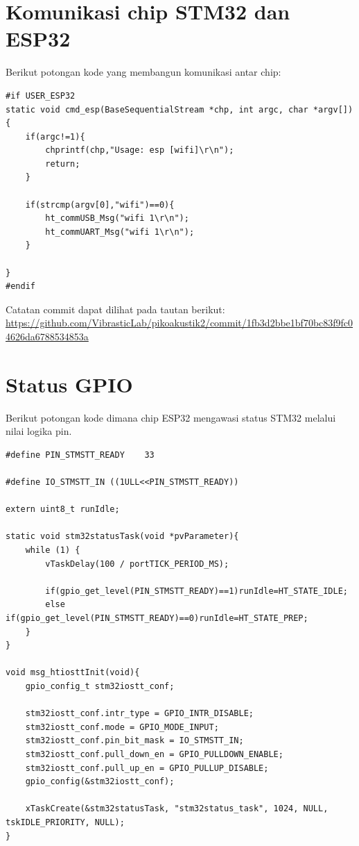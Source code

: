 \documentclass{book} %
\begin{document}
    \section{Komunikasi chip STM32 dan ESP32}
    
    Berikut potongan kode yang membangun komunikasi antar chip:
    
    \begin{verbatim}
#if USER_ESP32
static void cmd_esp(BaseSequentialStream *chp, int argc, char *argv[]) {
	if(argc!=1){
		chprintf(chp,"Usage: esp [wifi]\r\n");
		return;
	}
	
	if(strcmp(argv[0],"wifi")==0){
		ht_commUSB_Msg("wifi 1\r\n");
		ht_commUART_Msg("wifi 1\r\n");
	}
	
}
#endif
    \end{verbatim}

	Catatan commit dapat dilihat pada tautan berikut: \\
	\url{https://github.com/VibrasticLab/pikoakustik2/commit/1fb3d2bbe1bf70bc83f9fc04626da6788534853a}
	
	\section{Status GPIO}
	
	Berikut potongan kode dimana chip ESP32 mengawasi status STM32 melalui nilai logika pin.
	
	\begin{verbatim}
#define PIN_STMSTT_READY	33

#define IO_STMSTT_IN ((1ULL<<PIN_STMSTT_READY))

extern uint8_t runIdle;

static void stm32statusTask(void *pvParameter){
	while (1) {
		vTaskDelay(100 / portTICK_PERIOD_MS);
		
		if(gpio_get_level(PIN_STMSTT_READY)==1)runIdle=HT_STATE_IDLE;
		else if(gpio_get_level(PIN_STMSTT_READY)==0)runIdle=HT_STATE_PREP;
	}
}

void msg_htiosttInit(void){
	gpio_config_t stm32iostt_conf;
	
	stm32iostt_conf.intr_type = GPIO_INTR_DISABLE;
	stm32iostt_conf.mode = GPIO_MODE_INPUT;
	stm32iostt_conf.pin_bit_mask = IO_STMSTT_IN;
	stm32iostt_conf.pull_down_en = GPIO_PULLDOWN_ENABLE;
	stm32iostt_conf.pull_up_en = GPIO_PULLUP_DISABLE;
	gpio_config(&stm32iostt_conf);
	
	xTaskCreate(&stm32statusTask, "stm32status_task", 1024, NULL, tskIDLE_PRIORITY, NULL);
}
	\end{verbatim}
\end{document}
